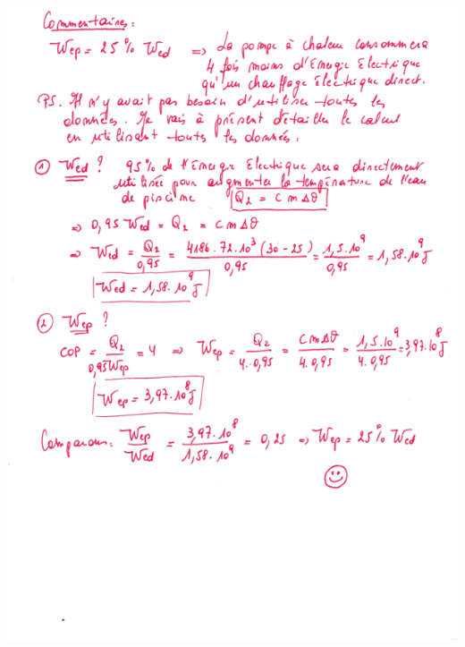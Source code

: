 \includegraphics[width=19.239cm,height=26.975cm]{Pictures/100000010000025300000343E2BD3741EC0DE6A2.png}

